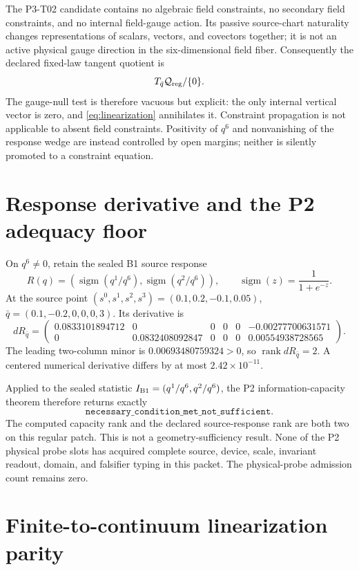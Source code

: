 \documentclass[11pt]{article}
\newcommand{\sigm}{\operatorname{sigm}}
\newcommand{\rank}{\operatorname{rank}}
\newcommand{\qbar}{\bar q}
\begin{document}
The P3-T02 candidate contains no algebraic field constraints, no secondary
field constraints, and no internal field-gauge action.  Its passive
source-chart naturality changes representations of scalars, vectors, and
covectors together; it is not an active physical gauge direction in the
six-dimensional field fiber.  Consequently the declared fixed-law tangent
quotient is
\[
 T_{\qbar}{\cal Q}_{\rm reg}/\{0\}.
\]
The gauge-null test is therefore vacuous but explicit: the only internal
vertical vector is zero, and \eqref{eq:linearization} annihilates it.  Constraint
propagation is not applicable to absent field constraints.  Positivity of
$q^6$ and nonvanishing of the response wedge are instead controlled by open
margins; neither is silently promoted to a constraint equation.

\section{Response derivative and the P2 adequacy floor}

On $q^6\ne0$, retain the sealed B1 source response
\[
 R(q)=\left(\sigm(q^1/q^6),\sigm(q^2/q^6)\right),
 \qquad \sigm(z)=\frac{1}{1+e^{-z}}.
\]
At the source point $(s^0,s^1,s^2,s^3)=(0.1,0.2,-0.1,0.05)$,
$\qbar=(0.1,-0.2,0,0,0,3)$.  Its derivative is
\[
 dR_{\qbar}=
 \begin{pmatrix}
 0.0833101894712&0&0&0&0&-0.00277700631571\\
 0&0.0832408092847&0&0&0&0.00554938728565
 \end{pmatrix}.
\]
The leading two-column minor is
$0.00693480759324>0$, so $\rank dR_{\qbar}=2$.  A centered numerical
derivative differs by at most $2.42\times10^{-11}$.

Applied to the sealed statistic
$I_{\rm B1}=(q^1/q^6,q^2/q^6)$, the P2 information-capacity theorem therefore
returns exactly
\[
 \texttt{necessary\_condition\_met\_not\_sufficient}.
\]
The computed capacity rank and the declared source-response rank are both two
on this regular patch.  This is not a geometry-sufficiency result.  None of the
P2 physical probe slots has acquired complete source, device, scale, invariant
readout, domain, and falsifier typing in this packet.  The physical-probe
admission count remains zero.

\section{Finite-to-continuum linearization parity}
\end{document}

